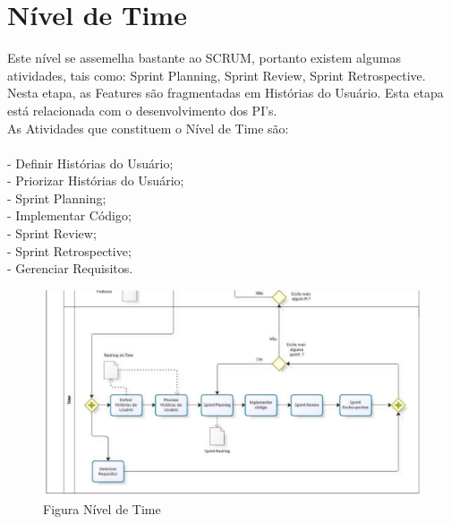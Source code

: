 \section{Nível de Time}
Este nível se assemelha bastante ao SCRUM,  portanto existem algumas atividades, tais como: Sprint Planning, Sprint Review, Sprint Retrospective. Nesta etapa, as Features são fragmentadas em Histórias do Usuário. Esta etapa está relacionada com o desenvolvimento dos PI’s.\\
\tab As Atividades que constituem o Nível de Time são:\\
\\
\tab - Definir Histórias do Usuário;\\
\tab - Priorizar Histórias do Usuário;\\
\tab - Sprint Planning;\\
\tab - Implementar Código;\\
\tab - Sprint Review;\\
\tab - Sprint Retrospective;\\
\tab - Gerenciar Requisitos.\\

\begin{figure}[h]
    \centering
    \label{fig01}
        \includegraphics[keepaspectratio=true,scale=0.5]{figuras/nivelTimeRequisitos.eps}
    \caption{Figura Nível de Time}
\end{figure}

